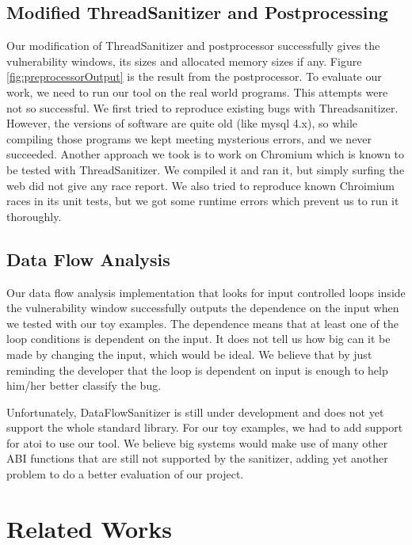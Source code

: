 \documentclass{acm_proc_article-sp}
\begin{document}
\subsection{Modified ThreadSanitizer and Postprocessing}

Our modification of ThreadSanitizer and postprocessor successfully gives the vulnerability windows, its sizes and allocated memory sizes if any. Figure \ref{fig:preprocessorOutput} is the result from the postprocessor. To evaluate our work, we need to run our tool on the real world programs. This attempts were not so successful. We first tried to reproduce existing bugs with Threadsanitizer. However, the versions of software are quite old (like mysql 4.x), so while compiling those programs we kept meeting mysterious errors, and we never succeeded. Another approach we took is to work on Chromium which is known to be tested with ThreadSanitizer. We compiled it and ran it, but simply surfing the web did not give any race report. We also tried to reproduce known Chroimium races in its unit tests, but we got some runtime errors which prevent us to run it thoroughly. 

\subsection{Data Flow Analysis}

Our data flow analysis implementation that looks for input controlled loops inside the vulnerability window successfully outputs the dependence on the input when we tested with our toy examples. The dependence means that at least one of the loop conditions is dependent on the input. It does not tell us how big can it be made by changing the input, which would be ideal. We believe that by just reminding the developer that the loop is dependent on input is enough to help him/her better classify the bug.

Unfortunately, DataFlowSanitizer is still under development and does not yet support the whole standard library. For our toy examples, we had to add support for atoi to use our tool. We believe big systems would make use of many other ABI functions that are still not supported by the sanitizer, adding yet another problem to do a better evaluation of our project.


\section{Related Works}
\end{document}
